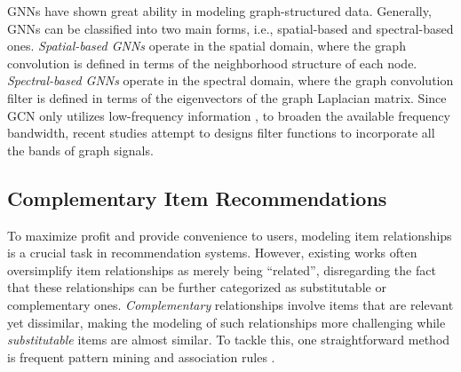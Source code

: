 \documentclass[letterpaper]{article} %
\begin{document}
GNNs \cite{wu2020comprehensive} have shown great ability in modeling graph-structured data. Generally, GNNs can be classified into two main forms, i.e., spatial-based and spectral-based ones. \textit{Spatial-based GNNs} \cite{hamilton2017inductive, velivckovic2017graph, gao2018large, zhu2023you} operate in the spatial domain, where the graph convolution is defined in terms of the neighborhood structure of each node. 
\textit{Spectral-based GNNs} \cite{bruna2013spectral, defferrard2016convolutional, kipf2016semi, balcilar2020bridging, wu2022beyond} operate in the spectral domain, where the graph convolution filter is defined in terms of the eigenvectors of the graph Laplacian matrix. 
Since GCN only utilizes low-frequency information \cite{balcilar2020bridging}, to broaden the available frequency bandwidth, recent studies \cite{balcilar2020bridging, wu2022beyond} attempt to designs filter functions to incorporate all the bands of graph signals.

\subsection{Complementary Item Recommendations}
To maximize profit and provide convenience to users, 
modeling item relationships is a crucial task in recommendation systems. However, existing works \cite{wang2011utilizing, yao2018judging,MengWSLCLZ18} often oversimplify item relationships as merely being ``related'', disregarding the fact that these relationships can be further categorized as substitutable or complementary ones. \textit{Complementary} relationships involve items that are relevant yet dissimilar, making the modeling of such relationships more challenging while \textit{substitutable} items are almost similar. To tackle this, one straightforward method is frequent pattern mining and association rules \cite{han2007frequent}. 
\end{document}

